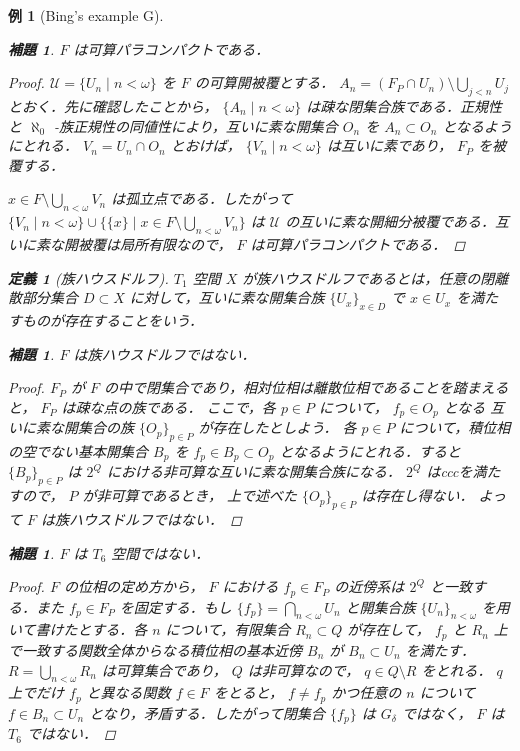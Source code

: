 \documentclass[leqno, 12pt]{ltjsarticle}
\newtheorem{lem}[thm]{補題}
\newtheorem{df}[thm]{定義}
\newtheorem{exam}[thm]{例}
\begin{document}
\begin{exam}[Bing's example G]
\begin{lem}
$F$
は可算パラコンパクトである．
\end{lem}
\begin{proof}
$\mathcal{U}=\{U_{n} \mid n<\omega\}$
を
$F$
の可算開被覆とする．
$A_{n}=(F_{P}\cap U_{n})\setminus\bigcup_{j<n}U_{j}$
とおく．先に確認したことから，
$\{A_{n} \mid n<\omega\}$
は疎な閉集合族である．正規性と
$\aleph_{0}$
-族正規性の同値性により，互いに素な開集合
$O_{n}$
を
$A_{n}\subset O_{n}$
となるようにとれる．
$V_{n}=U_{n}\cap O_{n}$
とおけば，
$\{V_{n} \mid n<\omega\}$
は互いに素であり，
$F_{P}$
を被覆する．

$x\in F\setminus\bigcup_{n<\omega}V_{n}$
は孤立点である．したがって
$\{V_{n} \mid n<\omega\}\cup\{\{x\} \mid x\in F\setminus\bigcup_{n<\omega}V_{n}\}$
は
$\mathcal{U}$
の互いに素な開細分被覆である．互いに素な開被覆は局所有限なので，
$F$
は可算パラコンパクトである．
\end{proof}

\begin{df}[族ハウスドルフ]
$T_{1}$
空間
$X$
が族ハウスドルフであるとは，任意の閉離散部分集合
$D\subset X$
に対して，互いに素な開集合族
$\{U_{x}\}_{x\in D}$
で
$x\in U_{x}$
を満たすものが存在することをいう．
\end{df}

\begin{lem}
$F$
は族ハウスドルフではない．
\end{lem}
\begin{proof}
$F_{P}$
が
$F$
の中で閉集合であり，相対位相は離散位相であることを踏まえると，
$F_{P}$
は疎な点の族である．
ここで，各
$p\in P$
について，
$f_{p}\in O_{p}$
となる
互いに素な開集合の族
$\{O_{p}\}_{p\in P}$
が存在したとしよう．
各
$p\in P$
について，積位相の空でない基本開集合
$B_{p}$
を
$f_{p}\in B_{p}\subset O_{p}$
となるようにとれる．すると
$\{B_{p}\}_{p\in P}$
は
$2^{Q}$
における非可算な互いに素な開集合族になる．
$2^{Q}$
はcccを満たすので，
$P$
が非可算であるとき，
上で述べた
$\{O_{p}\}_{p\in P}$
は存在し得ない．
よって
$F$
は族ハウスドルフではない．
\end{proof}

\begin{lem}
$F$
は
$T_{6}$
空間ではない．
\end{lem}
\begin{proof}
$F$
の位相の定め方から，
$F$
における
$f_{p}\in F_{P}$
の近傍系は
$2^{Q}$
と一致する．また
$f_{p}\in F_{P}$
を固定する．もし
$\{f_{p}\}=\bigcap_{n<\omega}U_{n}$
と開集合族
$\{U_{n}\}_{n<\omega}$
を用いて書けたとする．各
$n$
について，有限集合
$R_{n}\subset Q$
が存在して，
$f_{p}$
と
$R_{n}$
上で一致する関数全体からなる積位相の基本近傍
$B_{n}$
が
$B_{n}\subset U_{n}$
を満たす．
$R=\bigcup_{n<\omega}R_{n}$
は可算集合であり，
$Q$
は非可算なので，
$q\in Q\setminus R$
をとれる．
$q$
上でだけ
$f_{p}$
と異なる関数
$f\in F$
をとると，
$f\neq f_{p}$
かつ任意の
$n$
について
$f\in B_{n}\subset U_{n}$
となり，矛盾する．したがって閉集合
$\{f_{p}\}$
は
$G_{\delta}$
ではなく，
$F$
は
$T_{6}$
ではない．
\end{proof}


\end{exam}
\end{document}
